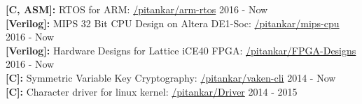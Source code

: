 
\reversemarginpar {}
\noindent \textbf{[C, ASM]:} \textcolor{ultramarine}{RTOS for ARM:} \href{https://github.com/pitankar/arm-rtos}{\faGithubSquare/pitankar/arm-rtos} \hfill 2016 - Now
\\
\noindent \textbf{[Verilog]:} \textcolor{ultramarine}{MIPS 32 Bit CPU Design on Altera DE1-Soc:} \href{https://github.com/pitankar/mips-cpu}{\faGithubSquare/pitankar/mips-cpu} \hfill 2016 - Now\\
\noindent \textbf{[Verilog]:} \textcolor{ultramarine}{Hardware Designs for Lattice iCE40 FPGA:} \href{https://github.com/pitankar/FPGA-Designs}{\faGithubSquare/pitankar/FPGA-Designs} \hfill 2016 - Now
\\
\textbf{[C]:} \textcolor{ultramarine}{Symmetric Variable Key Cryptography:} \href{https://github.com/pitankar/vaken-cli}{\faGithubSquare /pitankar/vaken-cli} \hfill 2014 - Now\\
\textbf{[C]:} \textcolor{ultramarine}{Character driver for linux kernel:} \href{https://gitlab.com/pitankar/Driver}{\faGitlab /pitankar/Driver} \hfill 2014 - 2015\\ 
